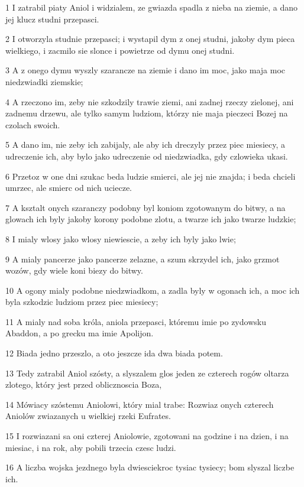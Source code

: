 \par 1 I zatrabil piaty Aniol i widzialem, ze gwiazda spadla z nieba na ziemie, a dano jej klucz studni przepasci.
\par 2 I otworzyla studnie przepasci; i wystapil dym z onej studni, jakoby dym pieca wielkiego, i zacmilo sie slonce i powietrze od dymu onej studni.
\par 3 A z onego dymu wyszly szarancze na ziemie i dano im moc, jako maja moc niedzwiadki ziemskie;
\par 4 A rzeczono im, zeby nie szkodzily trawie ziemi, ani zadnej rzeczy zielonej, ani zadnemu drzewu, ale tylko samym ludziom, którzy nie maja pieczeci Bozej na czolach swoich.
\par 5 A dano im, nie zeby ich zabijaly, ale aby ich dreczyly przez piec miesiecy, a udreczenie ich, aby bylo jako udreczenie od niedzwiadka, gdy czlowieka ukasi.
\par 6 Przetoz w one dni szukac beda ludzie smierci, ale jej nie znajda; i beda chcieli umrzec, ale smierc od nich uciecze.
\par 7 A ksztalt onych szaranczy podobny byl koniom zgotowanym do bitwy, a na glowach ich byly jakoby korony podobne zlotu, a twarze ich jako twarze ludzkie;
\par 8 I mialy wlosy jako wlosy niewiescie, a zeby ich byly jako lwie;
\par 9 A mialy pancerze jako pancerze zelazne, a szum skrzydel ich, jako grzmot wozów, gdy wiele koni biezy do bitwy.
\par 10 A ogony mialy podobne niedzwiadkom, a zadla byly w ogonach ich, a moc ich byla szkodzic ludziom przez piec miesiecy;
\par 11 A mialy nad soba króla, aniola przepasci, któremu imie po zydowsku Abaddon, a po grecku ma imie Apolijon.
\par 12 Biada jedno przeszlo, a oto jeszcze ida dwa biada potem.
\par 13 Tedy zatrabil Aniol szósty, a slyszalem glos jeden ze czterech rogów oltarza zlotego, który jest przed oblicznoscia Boza,
\par 14 Mówiacy szóstemu Aniolowi, który mial trabe: Rozwiaz onych czterech Aniolów zwiazanych u wielkiej rzeki Eufrates.
\par 15 I rozwiazani sa oni czterej Aniolowie, zgotowani na godzine i na dzien, i na miesiac, i na rok, aby pobili trzecia czesc ludzi.
\par 16 A liczba wojska jezdnego byla dwiesciekroc tysiac tysiecy; bom slyszal liczbe ich.

